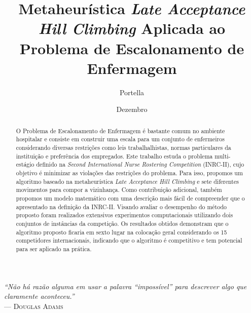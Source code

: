 \documentclass[cic,tc, twoside]{iiufrgs}
\title{Metaheurística \textit{Late Acceptance Hill Climbing} Aplicada ao Problema de Escalonamento de Enfermagem}
\author{Portella}{Victória Simonetti}
\date{Dezembro}{2017}
\begin{document}
 \renewcommand{\nominataReit}{Prof. Rui Vicente Oppermann}
 \providecommand{\nominataPRCAname}{Vice-Reitora}
 \providecommand{\nominataPRCA}{Prof\textsuperscript{a}. Jane Fraga Tutikian}
\maketitle

 \clearpage
 \begin{flushright}
     \mbox{}\vfill
     {\sffamily\itshape
       ``Não há razão alguma em usar a palavra ``impossível'' para descrever algo que claramente aconteceu.''\\}
     --- \textsc{Douglas Adams}
 \end{flushright}




\begin{abstract}

O Problema de Escalonamento de Enfermagem é bastante comum no ambiente hospitalar e consiste em construir uma escala para um conjunto de enfermeiros considerando diversas restrições como leis trabalhalhistas, normas particulares da instituição e preferência dos empregados.
Este trabalho estuda o problema multi-estágio definido na \textit{Second International Nurse Rostering Competition} (INRC-II), cujo objetivo é minimizar as violações das restrições do problema.
Para isso, propomos um algoritmo baseado na metaheurística \textit{Late Acceptance Hill Climbing} e sete diferentes movimentos para compor a vizinhança.
Como contribuição adicional, também propomos um modelo matemático com uma descrição mais fácil de compreender que o apresentado na definição da INRC-II.
Visando avaliar o desempenho do método proposto foram realizados extensivos experimentos computacionais utilizando dois conjuntos de instâncias da competição. 
Os resultados obtidos demonstram que o algoritmo proposto ficaria em sexto lugar na colocação geral considerando os 15 competidores internacionais, indicando que o algoritmo é competitivo e tem potencial para ser aplicado na prática.
\end{abstract}
\end{document}
